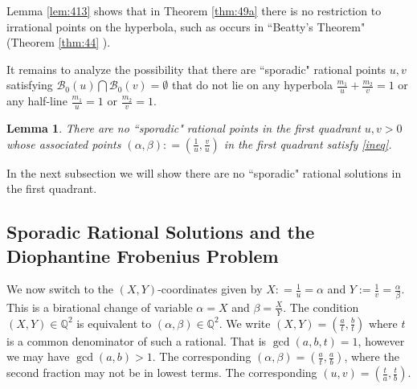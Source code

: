 \documentclass[12pt,letterpaper, reqno]{amsart}
\newtheorem{lem}[thm]{Lemma}
\theoremstyle{definition}
\theoremstyle{remark}
\newcommand{\QQ}{\mathbb{Q}}
\newcommand{\sB}{{\mathcal B}}
\begin{document}
Lemma \ref{lem:413} shows that  in Theorem \ref{thm:49a}
there is no restriction to irrational points on the hyperbola, such as
 occurs  in ``Beatty's Theorem" (Theorem \ref{thm:44} ).

It remains to analyze  the possibility that there are ``sporadic" rational points $u, v$
satisfying $\sB_0(u) \bigcap \sB_0(v)= \emptyset$
 that do not lie on any hyperbola 
$\frac{m_1}{u} + \frac{m_2}{v} =1$
or any half-line $\frac{m_1}{u}=1$ or $\frac{m_2}{v} =1$.

\begin{lem}\label{lem:413bb}
There are no ``sporadic" rational points in the first quadrant $u, v >0$
whose associated points $(\alpha, \beta): = (\frac{1}{u}, \frac{v}{u}) $ in the first quadrant satisfy \eqref{ineq}.
 \end{lem}

In the next subsection we will show there are no ``sporadic" rational solutions
in the first quadrant. 




\subsection{Sporadic Rational Solutions and the Diophantine Frobenius Problem }\label{sec:64}


We now switch to  the $(X, Y)$-coordinates given by $X: = \frac{1}{u}= \alpha$ and
$Y := \frac{1}{v} = \frac{\alpha}{\beta}$. 
This is a birational change of variable
$\alpha = X$ and $\beta =\frac{X}{Y}$.
The condition $(X, Y) \in \QQ^2$ is equivalent to $(\alpha, \beta) \in \QQ^2$.
We write $(X, Y) = (\frac{a}{t}, \frac{b}{t})$ where $t$ is a common denominator of 
such a rational. That is $\gcd(a, b, t) =1$, however we may have $\gcd(a, b) >1$.
The corresponding $(\alpha, \beta) = (\frac{a}{t}, \frac{a}{b})$, where the second
fraction may not be in lowest terms. The corresponding $(u, v) = (\frac{t}{a}, \frac{t}{b})$. 
\end{document}
